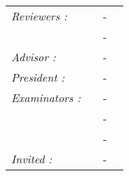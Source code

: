 \documentclass[a4paper,11pt,twoside]{ThesisStyle}
\begin{document}
\begin{titlepage}
\begin{center}
\begin{tabular}{llcl}
      \textit{Reviewers :}	&   \textsc{ }		& - &   \\
				&   \textsc{ }		& - &  \\
      \textit{Advisor :}	&  \textsc{}		& - &  \\
      \textit{President :}	&  \textsc{}		& - & \\
      \textit{Examinators :}   &  \textsc{}          & - & \\
      				&  \textsc{}			& - & \\
      				& \textsc{}		& - & \\
      \textit{Invited :}		&  \textsc{}		& - & 
\end{tabular}
\end{center}
\end{titlepage}
\sloppy
\titlepage















\end{document}
